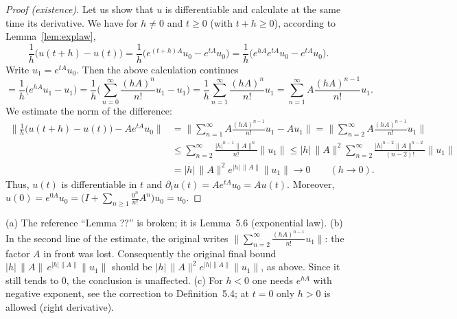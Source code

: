 \documentclass[11pt,a4paper]{article}
\numberwithin{equation}{section}
\theoremstyle{plain}
\theoremstyle{definition}
\theoremstyle{plain}
\theoremstyle{definition}
\begin{document}
\begin{proof}[Proof (existence)]
Let us show that $u$ is differentiable and calculate at the same time its derivative. We
have for $h\ne0$ and $t\ge0$ (with $t+h\ge0$), according to Lemma~\ref{lem:explaw},
\[
\frac1h\big(u(t+h)-u(t)\big)=\frac1h\big(e^{(t+h)A}u_0-e^{tA}u_0\big)=\frac1h\big(e^{hA}e^{tA}u_0-e^{tA}u_0\big).
\]
Write $u_1=e^{tA}u_0$. Then the above calculation continues
\[
=\frac1h\big(e^{hA}u_1-u_1\big)=\frac1h\Big(\sum_{n=0}^\infty\frac{(hA)^n}{n!}u_1-u_1\Big)
=\frac1h\sum_{n=1}^\infty\frac{(hA)^n}{n!}u_1=\sum_{n=1}^\infty A\frac{(hA)^{n-1}}{n!}u_1 .
\]
We estimate the norm of the difference:
\begin{align*}
\Big\|\frac1h\big(u(t+h)-u(t)\big)-Ae^{tA}u_0\Big\|
&=\Big\|\sum_{n=1}^\infty A\frac{(hA)^{n-1}}{n!}u_1-Au_1\Big\|
=\Big\|\sum_{n=2}^\infty A\frac{(hA)^{n-1}}{n!}u_1\Big\|\\
&\le\sum_{n=2}^\infty\frac{|h|^{n-1}\|A\|^{n}}{n!}\|u_1\|
\le|h|\,\|A\|^2\sum_{n=2}^\infty\frac{|h|^{n-2}\|A\|^{n-2}}{(n-2)!}\|u_1\|\\
&=|h|\,\|A\|^2e^{|h|\,\|A\|}\|u_1\|\to0\qquad(h\to0).
\end{align*}
Thus, $u(t)$ is differentiable in $t$ and $\partial_tu(t)=Ae^{tA}u_0=Au(t)$. Moreover,
$u(0)=e^{0A}u_0=\big(I+\sum_{n\ge1}\frac{0^n}{n!}A^n\big)u_0=u_0$.
\end{proof}

\begin{correction}
(a) The reference ``Lemma ??'' is broken; it is Lemma~5.6 (exponential law).
(b) In the second line of the estimate, the original writes
$\big\|\sum_{n=2}^\infty\frac{(hA)^{n-1}}{n!}u_1\big\|$: the factor $A$ in front was lost.
Consequently the original final bound $|h|\,\|A\|\,e^{|h|\|A\|}\|u_1\|$ should be
$|h|\,\|A\|^2e^{|h|\|A\|}\|u_1\|$, as above. Since it still tends to $0$, the conclusion
is unaffected. (c) For $h<0$ one needs $e^{hA}$ with negative exponent, see the correction
to Definition~5.4; at $t=0$ only $h>0$ is allowed (right derivative).
\end{correction}
\end{document}
